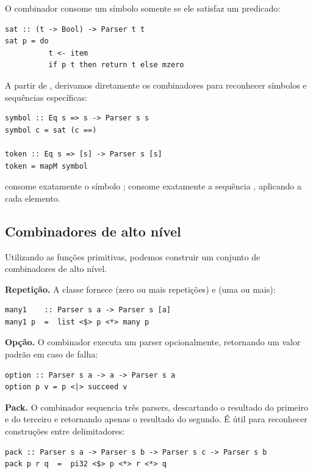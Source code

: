 O combinador  consome um símbolo somente
se ele satisfaz um predicado:

\begin{verbatim}
sat :: (t -> Bool) -> Parser t t
sat p = do
          t <- item
          if p t then return t else mzero
\end{verbatim}

A partir de , derivamos diretamente os
combinadores para reconhecer símbolos e sequências específicas:

\begin{verbatim}
symbol :: Eq s => s -> Parser s s
symbol c = sat (c ==)

token :: Eq s => [s] -> Parser s [s]
token = mapM symbol
\end{verbatim}

 consome exatamente o símbolo
; 
consome exatamente a sequência ,
aplicando  a cada elemento.

\subsection{Combinadores de alto nível}

Utilizando as funções primitivas, podemos construir um conjunto de
combinadores de alto nível.

\textbf{Repetição.} A classe 
fornece  (zero ou mais repetições) e
 (uma ou mais):

\begin{verbatim}
many1    :: Parser s a -> Parser s [a]
many1 p  =  list <$> p <*> many p
\end{verbatim}

\textbf{Opção.} O combinador  executa
um parser opcionalmente, retornando um valor padrão em caso de falha:

\begin{verbatim}
option :: Parser s a -> a -> Parser s a
option p v = p <|> succeed v
\end{verbatim}

\textbf{Pack.} O combinador  sequencia
três parsers, descartando o resultado do primeiro e do terceiro e
retornando apenas o resultado do segundo. É útil para reconhecer
construções entre delimitadores:

\begin{verbatim}
pack :: Parser s a -> Parser s b -> Parser s c -> Parser s b
pack p r q  =  pi32 <$> p <*> r <*> q
\end{verbatim}

